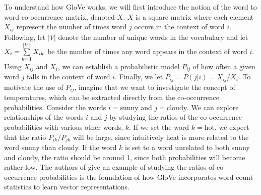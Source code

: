 To understand how GloVe works, we will first introduce the notion of the word to word co-occurrence matrix, denoted $X$. $X$ is a square matrix where each element $X_{ij}$ represent the number of times word $j$ occurs in the context of word $i$. Following, let $|V|$ denote the number of unique words in the vocabulary and let $X_i=\sum\limits_{k=1}^{|V|} X_{ik}$ be the number of times any word appears in the context of word $i$. Using $X_{ij}$ and $X_i$, we can establish a probabilistic model $P_{ij}$ of how often a given word $j$ falls in the context of word $i$. Finally, we let $P_{ij}=P(j|i)=X_{ij} / {X_i}$. To motivate the use of $P_{ij}$, imagine that we want to investigate the concept of temperatures, which can be extracted directly from the co-occurrence probabilities. Consider the words $i = \text{sunny}$ and $j = \text{cloudy}$. We can explore relationships of the words $i$ and $j$ by studying the ratios of the co-occurrence probabilities with various other words, $k$. If we set the word $k = \text{hot}$, we expect that the ratio $P_{ik} / P_{jk}$ will be large, since intuitively heat is more related to the word sunny than cloudy. If the word $k$ is set to a word unrelated to both sunny and cloudy, the ratio should be around 1, since both probabilities will become rather low. The authors of \cite{pennington2014glove} give an example of studying the ratios of co-occurrence probabilities is the foundation of how GloVe incorporates word count statistics to learn vector representations.


